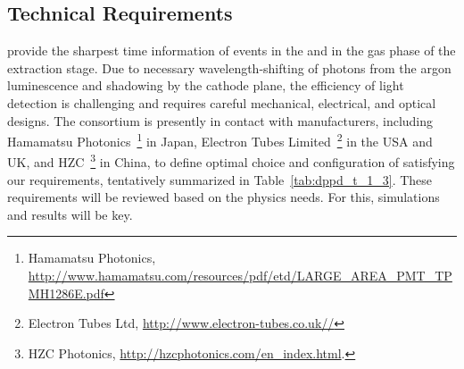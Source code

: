 \subsection{Technical Requirements}
\label{sec:fddp-pd-1.3}

 provide the sharpest time information of events in the \lartpc and in the gas phase of the extraction stage. Due to necessary wavelength-shifting of photons from the argon luminescence and shadowing by the cathode plane, the efficiency of light detection is challenging and requires careful mechanical, electrical, and optical designs. The \dual {} consortium is presently in contact with  manufacturers, including 
%
Hamamatsu Photonics~\footnote{Hamamatsu Photonics\texttrademark{}, \url{http://www.hamamatsu.com/resources/pdf/etd/LARGE_AREA_PMT_TPMH1286E.pdf}} in Japan, %
Electron Tubes Limited~\footnote{Electron Tubes Ltd\texttrademark{}, \url{http://www.electron-tubes.co.uk//}} in the USA and UK, and 
HZC~\footnote{HZC Photonics\texttrademark{}, \url{http://hzcphotonics.com/en_index.html}.} in China, 
to define optimal choice and configuration of  satisfying our requirements, tentatively summarized in Table~\ref{tab:dppd_t_1_3}. These requirements will be reviewed based on the physics needs. For this, simulations and  results will be key.

